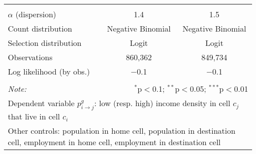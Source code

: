\begin{table}[!htbp]
{\begin{tabular}{@{\extracolsep{5pt}}lcccc}
 &  &  &  & \\
\hline \hline \\[-1.8ex]
$\alpha$ (dispersion) & \multicolumn{2}{c}{1.4} & \multicolumn{2}{c}{1.5} \\
Count distribution & \multicolumn{2}{c}{Negative Binomial} & \multicolumn{2}{c}{Negative Binomial} \\
Selection distribution & \multicolumn{2}{c}{Logit} & \multicolumn{2}{c}{Logit} \\
Observations & \multicolumn{2}{c}{860,362} & \multicolumn{2}{c}{849,734} \\
Log likelihood (by obs.) & \multicolumn{2}{c}{$-$0.1} & \multicolumn{2}{c}{$-$0.1} \\
\hline \\[-1.8ex]
\textit{Note:}  & \multicolumn{4}{r}{$^{*}$p$<$0.1; $^{**}$p$<$0.05; $^{***}$p$<$0.01} \\
 \multicolumn{5}{p{0.9\linewidth}}{\parbox[t]{\textwidth}{Dependent variable $p_{i \to j}^g$: low (resp. high) income density in cell $c_j$ that live in cell $c_i$}} \\
 \multicolumn{5}{p{0.9\linewidth}}{\parbox[t]{\textwidth}{Other controls: population in home cell, population in destination cell, employment in home cell, employment in destination cell}}

\end{tabular}
}
\end{table}
